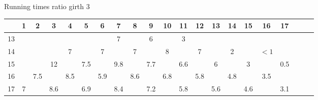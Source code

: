 \noindent Running times ratio girth $3$

\noindent\begin{tabular}{|c|c|c|c|c|c|c|c|c|c|c|c|c|c|c|c|c|c|c|c|c|}
    \hline
    & 1 & 2 & 3 & 4 & 5 & 6 & 7 & 8 & 9 & 10 & 11 & 12 & 13 & 14 & 15 & 16 & 17 \\ \hline
    13 & & & & & & & 7 & & 6 & & 3 & & & & & & \\ \hline
    14 & & & & 7 & & 7 & & 7 & & 8 & & 7 & & 2 & & $< 1$ & \\ \hline
    15 & & & 12 & & 7.5 & & 9.8 & & 7.7 & & 6.6 & & 6 & & 3 & & 0.5 \\ \hline
    16 & & 7.5 & & 8.5 & & 5.9 & & 8.6 & & 6.8 & & 5.8 & & 4.8 & & 3.5 & \\ \hline
    17 & 7 & & 8.6 & & 6.9 & & 8.4 & & 7.2 & & 5.8 & & 5.6 & & 4.6 & & 3.1\\ \hline
\end{tabular}

